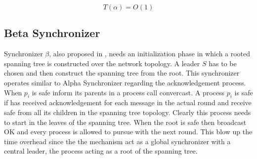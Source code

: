 \begin{equation}
\label{ec:time-alpha}
 T(\alpha) = O(1) 
\end{equation}


\subsection{Beta Synchronizer}

Synchronizer $\beta$, also proposed in \cite{awerbuch1985complexity}, needs an initialization phase in which a rooted spanning tree is constructed over the network topology. A leader $S$ has to be chosen and then construct the spanning tree from the root. This synchronizer operates similar to Alpha Synchronizer regarding the acknowledgement process. When $p_i$ is safe inform its parents in a process call convercast. A process $p_i$ is safe if has received acknowledgement for each message in the actual round and receive safe from all its children in the spanning tree topology. Clearly this process needs to start in the leaves of the spanning tree. When the root is safe then broadcast OK and every process is allowed to pursue with the next round. This blow up the time overhead since the the mechanism act as a global synchronizer with a central leader, the process acting as a root of the spanning tree. 


